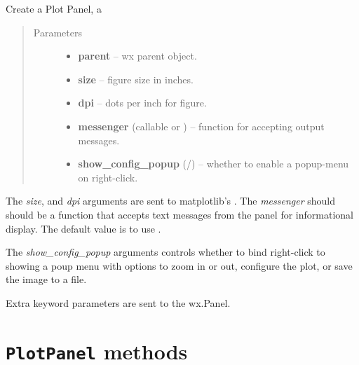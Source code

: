 \documentclass[letterpaper,10pt,english]{sphinxmanual}
\begin{document}
\begin{fulllineitems}
\label{plotpanel:PlotPanel}
Create a Plot Panel, a 
\begin{quote}\begin{description}
\item[{Parameters}] \leavevmode\begin{itemize}
\item {} 
\textbf{parent} -- wx parent object.

\item {} 
\textbf{size} -- figure size in inches.

\item {} 
\textbf{dpi} -- dots per inch for figure.

\item {} 
\textbf{messenger} (callable or ) -- function for accepting output messages.

\item {} 
\textbf{show\_config\_popup} (/) -- whether to enable a popup-menu on right-click.

\end{itemize}

\end{description}\end{quote}

The \emph{size}, and \emph{dpi} arguments are sent to matplotlib's
.  The \emph{messenger} should should be a function that
accepts text messages from the panel for informational display.  The
default value is to use .

The \emph{show\_config\_popup} arguments controls whether to bind right-click
to showing a poup menu with options to zoom in or out, configure the
plot, or save the image to a file.

Extra keyword parameters are sent to the wx.Panel.

\end{fulllineitems}



\section{\texttt{PlotPanel} methods}
\label{plotpanel:plotpanel-methods}
\end{document}
